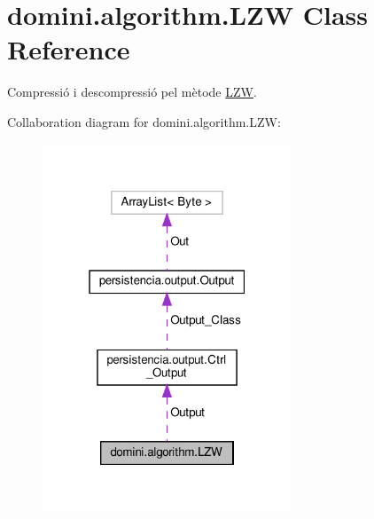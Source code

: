 \hypertarget{classdomini_1_1algorithm_1_1LZW}{}\section{domini.\+algorithm.\+L\+ZW Class Reference}
\label{classdomini_1_1algorithm_1_1LZW}


Compressió i descompressió pel mètode \hyperlink{classdomini_1_1algorithm_1_1LZW}{L\+ZW}.  




Collaboration diagram for domini.\+algorithm.\+L\+ZW\+:
\nopagebreak
\begin{figure}[H]
\begin{center}
\leavevmode
\includegraphics[width=211pt]{classdomini_1_1algorithm_1_1LZW__coll__graph}
\end{center}
\end{figure}
